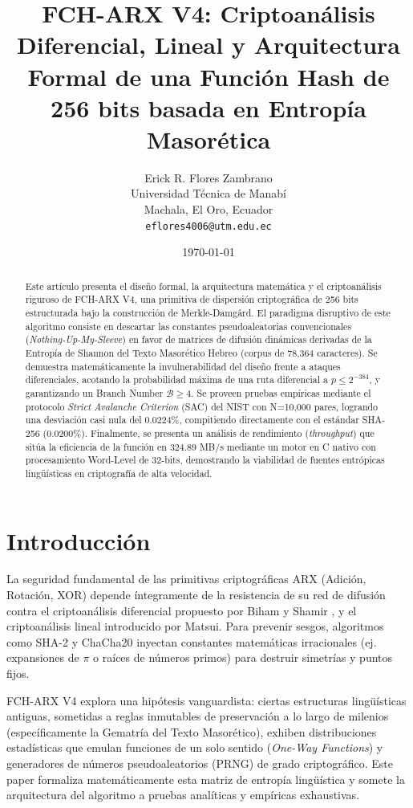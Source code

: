 \documentclass[10pt,twocolumn,letterpaper]{article}
\title{\LARGE \bf
FCH-ARX V4: Criptoanálisis Diferencial, Lineal y Arquitectura Formal de una Función Hash de 256 bits basada en Entropía Masorética
}
\author{
Erick R. Flores Zambrano\\
Universidad Técnica de Manabí\\
Machala, El Oro, Ecuador\\
{\tt\small eflores4006@utm.edu.ec}
}
\date{\today}
\begin{document}
\maketitle
\thispagestyle{empty}

\begin{abstract}
Este artículo presenta el diseño formal, la arquitectura matemática y el criptoanálisis riguroso de FCH-ARX V4, una primitiva de dispersión criptográfica de 256 bits estructurada bajo la construcción de Merkle-Damgård. El paradigma disruptivo de este algoritmo consiste en descartar las constantes pseudoaleatorias convencionales (\textit{Nothing-Up-My-Sleeve}) en favor de matrices de difusión dinámicas derivadas de la Entropía de Shannon del Texto Masorético Hebreo (corpus de 78,364 caracteres). Se demuestra matemáticamente la invulnerabilidad del diseño frente a ataques diferenciales, acotando la probabilidad máxima de una ruta diferencial a $p \leq 2^{-384}$, y garantizando un Branch Number $\mathcal{B} \geq 4$. Se proveen pruebas empíricas mediante el protocolo \textit{Strict Avalanche Criterion} (SAC) del NIST con N=10,000 pares, logrando una desviación casi nula del 0.0224\%, compitiendo directamente con el estándar SHA-256 (0.0200\%). Finalmente, se presenta un análisis de rendimiento (\textit{throughput}) que sitúa la eficiencia de la función en $324.89$ MB/s mediante un motor en C nativo con procesamiento Word-Level de 32-bits, demostrando la viabilidad de fuentes entrópicas lingüísticas en criptografía de alta velocidad.
\end{abstract}

\section{Introducción}
La seguridad fundamental de las primitivas criptográficas ARX (Adición, Rotación, XOR) depende íntegramente de la resistencia de su red de difusión contra el criptoanálisis diferencial propuesto por Biham y Shamir \cite{differential}, y el criptoanálisis lineal introducido por Matsui. Para prevenir sesgos, algoritmos como SHA-2 y ChaCha20 inyectan constantes matemáticas irracionales (ej. expansiones de $\pi$ o raíces de números primos) para destruir simetrías y puntos fijos.

FCH-ARX V4 explora una hipótesis vanguardista: ciertas estructuras lingüísticas antiguas, sometidas a reglas inmutables de preservación a lo largo de milenios (específicamente la Gematría del Texto Masorético), exhiben distribuciones estadísticas que emulan funciones de un solo sentido (\textit{One-Way Functions}) y generadores de números pseudoaleatorios (PRNG) de grado criptográfico. Este paper formaliza matemáticamente esta matriz de entropía lingüística y somete la arquitectura del algoritmo a pruebas analíticas y empíricas exhaustivas.
\end{document}
